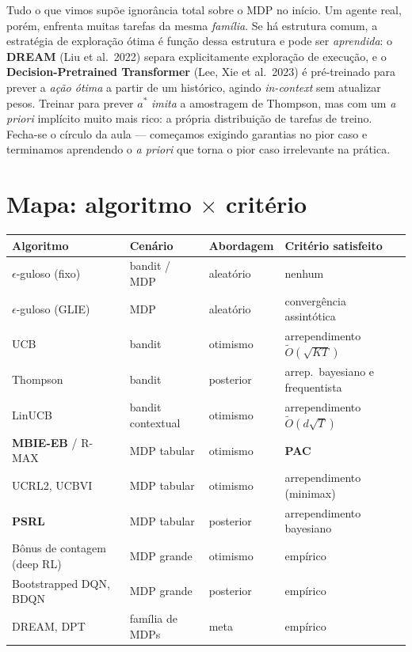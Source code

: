 \documentclass[11pt, a4paper]{article}
\begin{document}
Tudo o que vimos supõe ignorância total sobre o MDP no início. Um agente real, porém,
enfrenta muitas tarefas da mesma \emph{família}. Se há estrutura comum, a estratégia de
exploração ótima é função dessa estrutura e pode ser \emph{aprendida}: o \textbf{DREAM}
(Liu et al.\ 2022) separa explicitamente exploração de execução, e o
\textbf{Decision-Pretrained Transformer} (Lee, Xie et al.\ 2023) é pré-treinado para
prever a \emph{ação ótima} a partir de um histórico, agindo \textit{in-context} sem
atualizar pesos. Treinar para prever $a^{*}$ \emph{imita} a amostragem de Thompson, mas
com um \textit{a priori} implícito muito mais rico: a própria distribuição de tarefas de
treino. Fecha-se o círculo da aula --- começamos exigindo garantias no pior caso e
terminamos aprendendo o \textit{a priori} que torna o pior caso irrelevante na prática.

\section{Mapa: algoritmo \texorpdfstring{$\times$}{x} critério}

\begin{center}\small
\begin{tabular}{@{}llll@{}}
\toprule
\textbf{Algoritmo} & \textbf{Cenário} & \textbf{Abordagem} & \textbf{Critério satisfeito} \\
\midrule
$\epsilon$-guloso (fixo)    & bandit / MDP      & aleatório & nenhum \\
$\epsilon$-guloso (GLIE)    & MDP               & aleatório & convergência assintótica \\
UCB                         & bandit            & otimismo  & arrependimento $\tilde{O}(\sqrt{KT})$ \\
Thompson                    & bandit            & posterior & arrep.\ bayesiano e frequentista \\
LinUCB                      & bandit contextual & otimismo  & arrependimento $\tilde{O}(d\sqrt{T})$ \\
\textbf{MBIE-EB} / R-MAX    & MDP tabular       & otimismo  & \textbf{PAC} \\
UCRL2, UCBVI                & MDP tabular       & otimismo  & arrependimento (minimax) \\
\textbf{PSRL}               & MDP tabular       & posterior & arrependimento bayesiano \\
Bônus de contagem (deep RL) & MDP grande        & otimismo  & empírico \\
Bootstrapped DQN, BDQN      & MDP grande        & posterior & empírico \\
DREAM, DPT                  & família de MDPs   & meta      & empírico \\
\bottomrule
\end{tabular}
\end{center}
\end{document}
